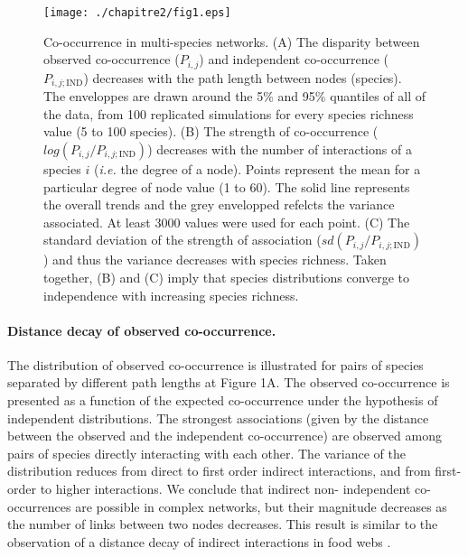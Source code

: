 \begin{figure}[h]
\texttt{[image: ./chapitre2/fig1.eps]}
\caption{Co-occurrence in multi-species networks.
(A) The disparity between observed co-occurrence ($P_{i,j}$) and independent co-occurrence ($P_{i,j;\text{IND}}$) decreases with the path length between nodes (species). The enveloppes are drawn around the 5\% and 95\% quantiles of all of the data, from 100 replicated simulations for every species richness value (5 to 100 species).
(B) The strength of co-occurrence ($log(P_{i,j}/P_{i,j;\text{IND}})$) decreases with the number of interactions of a species $i$ (\textit{i.e.} the degree of a node). Points represent the mean for a particular degree of node value (1 to 60). The solid line represents the overall trends and the grey envelopped refelcts the variance associated. At least 3000 values were used for each point.
(C) The standard deviation of the strength of association ($sd(P_{i,j}/P_{i,j;\text{IND}})$) and thus the variance decreases with species richness. Taken together, (B) and (C) imply that species distributions converge to independence with increasing species richness.}
\label{fig:1}
\end{figure}

\paragraph*{Distance decay of observed co-occurrence.} The distribution of
observed co-occurrence is illustrated for pairs of species separated by
different path lengths at Figure 1A. The observed co-occurrence is presented
as a function of the expected co-occurrence under the hypothesis of
independent distributions. The strongest associations (given by the distance
between the observed and the independent co-occurrence) are observed among
pairs of species directly interacting with each other. The variance of the
distribution reduces from direct to first order indirect interactions, and
from first-order to higher interactions. We conclude that indirect non-
independent co-occurrences are possible in complex networks, but their
magnitude decreases as the number of links between two nodes decreases. This
result is similar to the observation of a distance decay of indirect
interactions in food webs \citep{Berlow2009}.



